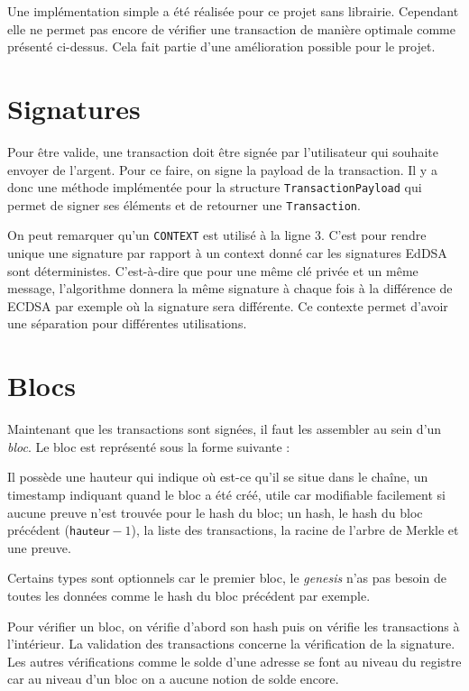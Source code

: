 Une implémentation simple a été réalisée pour ce projet sans librairie. Cependant elle ne permet pas encore de vérifier une transaction de manière optimale comme présenté ci-dessus. Cela fait partie d'une amélioration possible pour le projet.

\section{Signatures}
\label{sec:signature}

Pour être valide, une transaction doit être signée par l'utilisateur qui souhaite envoyer de l'argent. Pour ce faire, on signe la payload de la transaction. Il y a donc une méthode implémentée pour la structure \verb|TransactionPayload| qui permet de signer ses éléments et de retourner une \verb|Transaction|.


On peut remarquer qu'un \verb|CONTEXT| est utilisé à la ligne 3. C'est pour rendre unique une signature par rapport à un context donné car les signatures EdDSA sont déterministes. C'est-à-dire que pour une même clé privée et un même message, l'algorithme donnera la même signature à chaque fois à la différence de ECDSA par exemple où la signature sera différente. Ce contexte permet d'avoir une séparation pour différentes utilisations.

\section{Blocs}

Maintenant que les transactions sont signées, il faut les assembler au sein d'un \emph{bloc}. Le bloc est représenté sous la forme suivante :


Il possède une hauteur qui indique où est-ce qu'il se situe dans le chaîne, un timestamp indiquant quand le bloc a été créé, utile car modifiable facilement si aucune preuve n'est trouvée pour le hash du bloc; un hash, le hash du bloc précédent ($\mathsf{hauteur} - 1$), la liste des transactions, la racine de l'arbre de Merkle et une preuve.

Certains types sont optionnels car le premier bloc, le \emph{genesis} n'as pas besoin de toutes les données comme le hash du bloc précédent par exemple.

Pour vérifier un bloc, on vérifie d'abord son hash puis on vérifie les transactions à l'intérieur. La validation des transactions concerne la vérification de la signature. Les autres vérifications comme le solde d'une adresse se font au niveau du registre car au niveau d'un bloc on a aucune notion de solde encore.

